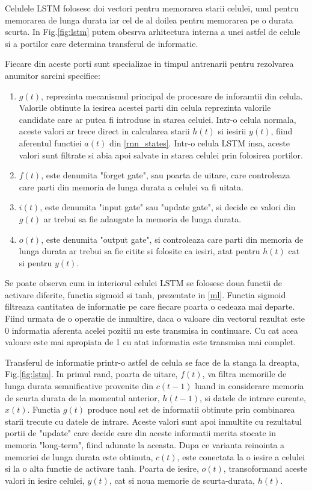 \documentclass[a4paper,12pt]{book}
\begin{document}
				Celulele LSTM folosesc doi vectori pentru memorarea starii celulei, unul pentru memorarea de lunga durata iar cel de al doilea pentru memorarea pe o durata scurta. In Fig.\ref{fig:lstm} putem obesrva arhitectura interna a unei astfel de celule si a portilor care determina transferul de informatie. \par
				 Fiecare din aceste porti sunt specializae in timpul antrenarii pentru rezolvarea anumitor sarcini specifice:
				\begin{enumerate}
					\item $g(t)$, reprezinta mecanismul principal de procesare de inforamtii din celula. Valorile obtinute la iesirea acestei parti din celula reprezinta valorile candidate care ar putea fi introduse in starea celuiei.  Intr-o celula normala, aceste valori ar trece direct in calcularea starii $h(t)$ si iesirii $y(t)$, fiind aferentul functiei $a(t)$ din \ref{rnn_states}. Intr-o celula LSTM insa, aceste valori sunt filtrate si abia apoi salvate in starea celulei prin folosirea portilor.
					\item $f(t)$, este denumita "forget gate", sau poarta de uitare, care controleaza care parti din memoria de lunga durata a celulei va fi uitata.
					\item $i(t)$, este denumita "input gate" sau "update gate", si decide ce valori din $g(t)$ ar trebui sa fie adaugate la memoria de lunga durata.
					\item $o(t)$, este denumita "output gate", si controleaza care parti din memoria de lunga durata ar trebui sa fie citite si folosite ca iesiri, atat pentru $h(t)$ cat si pentru $y(t)$. 
				\end{enumerate}
				Se poate observa cum in interiorul celulei LSTM se folosesc doua functii de activare diferite, functia sigmoid si tanh, prezentate in \ref{ml}. Functia sigmoid filtreaza cantitatea de informatie pe care fiecare poarta o cedeaza mai departe. Fiind urmata de o operatie de inmultire, daca o valoare din vectorul rezultat este 0 informatia aferenta acelei pozitii nu este transmisa in continuare. Cu cat acea valoare este mai apropiata de 1 cu atat informatia este transmisa mai complet. \par
				Transferul de informatie printr-o astfel de celula se face de la stanga la dreapta, Fig.\ref{fig:lstm}. In primul rand, poarta de uitare, $f(t)$, va filtra memoriile de lunga durata semnificative provenite din $c(t-1)$ luand in considerare memoria de scurta durata de la momentul anterior, $h(t-1)$, si datele de intrare curente, $x(t)$. Functia $g(t)$ produce noul set de informatii obtinute prin combinarea starii trecute cu datele de intrare. Aceste valori sunt apoi inmultite cu rezultatul portii de "update" care decide care din aceste informatii merita stocate in memoria "long-term", fiind adunate la aceasta. Dupa ce varianta reinointa a memoriei de lunga durata este obtinuta, $c(t)$, este conectata la o iesire a celulei si la o alta functie de activare tanh. Poarta de iesire, $o(t)$, transoformand aceste valori in iesire celulei, $y(t)$, cat si noua memorie de scurta-durata, $h(t)$. \par
\end{document}
